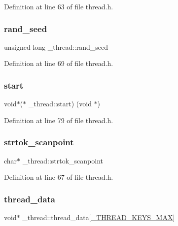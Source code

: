 Definition at line 63 of file thread.\+h.

\mbox{\label{struct__thread_aea692689f0651abeafb8dbce076c8f40}} 
\subsubsection{\texorpdfstring{rand\_seed}{rand\_seed}}
{\footnotesize\ttfamily unsigned long \+\_\+thread\+::rand\+\_\+seed}



Definition at line 69 of file thread.\+h.

\mbox{\label{struct__thread_aced825c6b63172f82cd026db0472db2e}} 
\subsubsection{\texorpdfstring{start}{start}}
{\footnotesize\ttfamily void$\ast$($\ast$ \+\_\+thread\+::start) (void $\ast$)}



Definition at line 79 of file thread.\+h.

\mbox{\label{struct__thread_a27b89cf9b6b70540b133827f387698df}} 
\subsubsection{\texorpdfstring{strtok\_scanpoint}{strtok\_scanpoint}}
{\footnotesize\ttfamily char$\ast$ \+\_\+thread\+::strtok\+\_\+scanpoint}



Definition at line 67 of file thread.\+h.

\mbox{\label{struct__thread_a71816284f1e2caf1bca6b6f6b30454a1}} 
\subsubsection{\texorpdfstring{thread\_data}{thread\_data}}
{\footnotesize\ttfamily void$\ast$ \+\_\+thread\+::thread\+\_\+data\mbox{[}\mbox{\hyperlink{thread_8h_ae7fee02a354b0f3c3d1f2581b2c00c27}{\+\_\+\+T\+H\+R\+E\+A\+D\+\_\+\+K\+E\+Y\+S\+\_\+\+M\+AX}}\mbox{]}}




